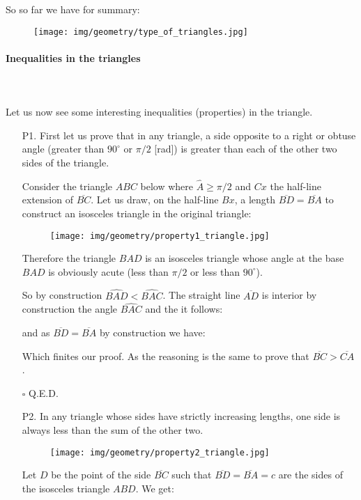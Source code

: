 	So so far we have for summary:
	\begin{figure}[H]
		\centering
		\texttt{[image: img/geometry/type\_of\_triangles.jpg]}
	\end{figure}
	
	\pagebreak
	\paragraph{Inequalities in the triangles}\mbox{}\\\\
	Let us now see some interesting inequalities (properties) in the triangle.
	\begin{enumerate}
		\item[P1.] First let us prove that in any triangle, a side opposite to a right or obtuse angle (greater than $90^\circ$ or $\pi/2$ [rad]) is greater than each of the other two sides of the triangle.

		\begin{dem}
		Consider the triangle $ABC$ below where $\hat{A}\geq \pi/2$ and $Cx$ the half-line extension of $\overline{BC}$. Let us draw, on the half-line $Bx$, a length $\overline{BD}=\overline{BA}$ to construct an isosceles triangle in the original triangle:
		\begin{figure}[H]
			\centering
			\texttt{[image: img/geometry/property1\_triangle.jpg]}
		\end{figure}
		Therefore the triangle $BAD$ is an isosceles triangle whose angle at the base $BAD$ is obviously acute (less than $\pi/2$ or less than $90^\circ$).
		
		So by construction $\widehat{BAD}<\widehat{BAC}$. The straight line $\overline{AD}$ is interior by construction the angle $\widehat{BAC}$ and the it follows:
		
		and as $\overline{BD}=\overline{BA}$ by construction we have:
		
		Which finites our proof. As the reasoning is the same to prove that $\overline{BC}>\overline{CA}$.
		\begin{flushright}
			$\square$  Q.E.D.
		\end{flushright}
		\end{dem}

		\item[P2.] In any triangle whose sides have strictly increasing lengths, one side is always less than the sum of the other two.
		\begin{figure}[H]
			\centering
			\texttt{[image: img/geometry/property2\_triangle.jpg]}
		\end{figure}
		\begin{dem}
		Let $D$ be the point of the side $\overline{BC}$ such that $\overline{BD}=\overline{BA}=c$ are the sides of the isosceles triangle $ABD$. We get:
		

\end{dem}
\end{enumerate}
